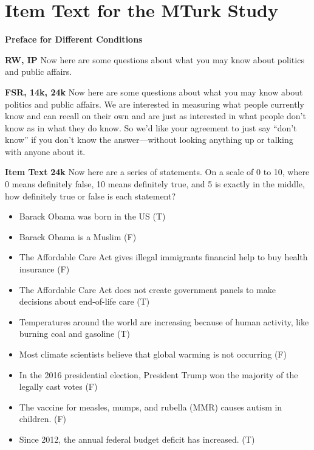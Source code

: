 \documentclass[12pt, letterpaper]{article}
\begin{document}
\clearpage
\section{Item Text for the MTurk Study}\label{si:mturk}

\textbf{Preface for Different Conditions}

\textbf{RW, IP}\newline
Now here are some questions about what you may know about politics and public affairs.

\textbf{FSR, 14k, 24k}\newline
Now here are some questions about what you may know about politics and public affairs.
We are interested in measuring what people currently know and can recall on their own and are
just as interested in what people don't know as in what they do know. So we'd like your
agreement to just say ``don't know'' if you don't know the answer—without looking anything up
or talking with anyone about it.

\textbf{Item Text}
\textbf{24k}\newline
Now here are a series of statements. On a scale of 0 to 10, where 0 means definitely false,
10 means definitely true, and 5 is exactly in the middle, how definitely true or false is
each statement?

\begin{itemize}
	\item Barack Obama was born in the US (T)
	\item  Barack Obama is a Muslim (F)
	\item  The Affordable Care Act gives illegal immigrants financial help to buy health insurance (F)
	\item  The Affordable Care Act does not create government panels to make decisions about end-of-life care (T)
	\item  Temperatures around the world are increasing because of human activity, like burning coal and gasoline (T)
	\item  Most climate scientists believe that global warming is not occurring (F)
	\item  In the 2016 presidential election, President Trump won the majority of the legally cast votes (F)
	\item  The vaccine for measles, mumps, and rubella (MMR) causes autism in children. (F)
	\item  Since 2012, the annual federal budget deficit has increased. (T)
\end{itemize}
\end{document}
